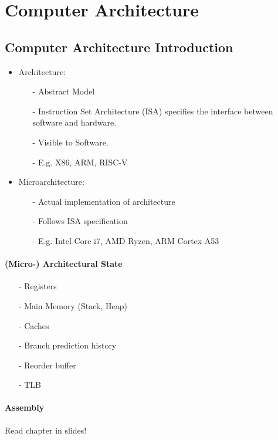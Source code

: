 \section{Computer Architecture}

\subsection{Computer Architecture Introduction}

\begin{itemize}
    \item Architecture: 
    \begin{itemize}
        \item[-]Abstract Model
        \item[-]Instruction Set Architecture (ISA) specifies the interface between software and hardware.
        \item[-]Visible to Software.
        \item[-]E.g. X86, ARM, RISC-V
    \end{itemize}{}
    \item Microarchitecture: 
    \begin{itemize}
        \item[-]Actual implementation of architecture
        \item[-]Follows ISA specification
        \item[-]E.g. Intel Core i7, AMD Ryzen, ARM Cortex-A53
    \end{itemize}{}
\end{itemize}{}

\paragraph{(Micro-) Architectural State} 
\begin{itemize}
    \item[-]Registers
    \item[-]Main Memory (Stack, Heap)
    \item[-]Caches
    \item[-]Branch prediction history
    \item[-]Reorder buffer
    \item[-]TLB
\end{itemize}{}

\paragraph{Assembly} Read chapter in slides!

